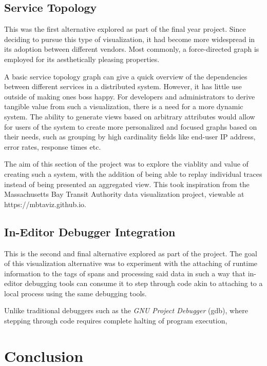 \documentclass[pdftex,titlepage]{article}
\begin{document}
        \subsection{Service Topology}
        This was the first alternative explored as part of the final year project. Since deciding to pursue this type of visualization,
        it had become more widespread in its adoption between different vendors. Most commonly, a force-directed graph is employed
        for its aesthetically pleasing properties.

        A basic service topology graph can give a quick overview of the dependencies between different services in a distributed
        system. However, it has little use outside of making ones boss happy. For developers and administrators to derive tangible
        value from such a visualization, there is a need for a more dynamic system. The ability to generate views based on arbitrary
        attributes would allow for users of the system to create more personalized and focused graphs based on their needs,
        such as grouping by high cardinality fields like end-user IP address, error rates, response times etc.

        The aim of this section of the project was to explore the viablity and value of creating such a system, with the addition
        of being able to replay individual traces instead of being presented an aggregated view. This took inspiration from the
        Massachusetts Bay Transit Authority data visualization project, viewable at https://mbtaviz.github.io.

        \subsection{In-Editor Debugger Integration}
        This is the second and final alternative explored as part of the project. The goal of this visualization alternative was to
        experiment with the attaching of runtime information to the tags of spans and processing said data in such a way that in-editor
        debugging tools can consume it to step through code akin to attaching to a local process using the same debugging tools.

        Unlike traditional debuggers such as the \textit{GNU Project Debugger} (gdb), where stepping through code requires complete
        halting of program execution, 



    \section{Conclusion}
\end{document}
